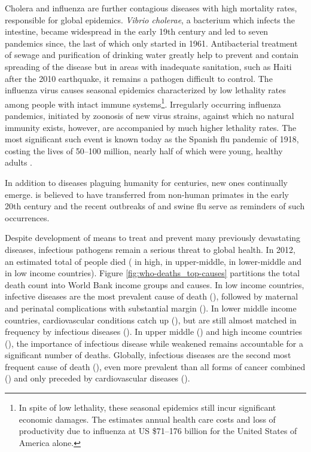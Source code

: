 Cholera and influenza are further contagious diseases with high mortality rates, responsible for global epidemics. \textit{Vibrio cholerae}, a bacterium which infects the intestine, became widespread in the early 19th century and led to seven pandemics since, the last of which only started in 1961. Antibacterial treatment of sewage and purification of drinking water greatly help to prevent and contain spreading of the disease but in areas with inadequate sanitation, such as Haiti after the 2010 earthquake, it remains a pathogen difficult to control. The influenza virus causes seasonal epidemics characterized by low lethality rates among people with intact immune systems\footnote{In spite of low lethality, these seasonal epidemics still incur significant economic damages. The \citet{WHO2003} estimates annual health care costs and loss of productivity due to influenza at US \$71--176 billion for the United States of America alone.}. Irregularly occurring influenza pandemics, initiated by zoonosis of new virus strains, against which no natural immunity exists, however, are accompanied by much higher lethality rates. The most significant such event is known today as the Spanish flu pandemic of 1918, costing the lives of 50--100 million, nearly half of which were young, healthy adults \citep{Taubenberger2006}.

In addition to diseases plaguing humanity for centuries, new ones continually emerge.  is believed to have transferred from non-human primates in the early 20th century and the recent outbreaks of  and swine flu serve as reminders of such occurrences.




Despite development of means to treat and prevent many previously devastating diseases, infectious pathogens remain a serious threat to global health. In 2012, an estimated total of \knitrTotalDeathsTwelve{} people died (\knitrPercentageDeathsTwelveHigh{} in high, \knitrPercentageDeathsTwelveUmid{} in upper-middle, \knitrPercentageDeathsTwelveLmid{} in lower-middle and \knitrPercentageDeathsTwelveLow{} in low income countries). Figure \ref{fig:who-deaths_top-causes} partitions the total death count into World Bank income groups and causes. In low income countries, infective diseases are the most prevalent cause of death (\knitrPercentDeathsTwelveLowInfect{}), followed by maternal and perinatal complications with substantial margin (\knitrPercentDeathsTwelveLowPerinat{}). In lower middle income countries, cardiovascular conditions catch up (\knitrPercentDeathsTwelveLmidCardio{}), but are still almost matched in frequency by infectious diseases (\knitrPercentDeathsTwelveLmidInfect{}). In upper middle (\knitrPercentDeathsTwelveUmidInfect{}) and high income countries (\knitrPercentDeathsTwelveHighInfect{}), the importance of infectious disease while weakened remains accountable for a significant number of deaths. Globally, infectious diseases are the second most frequent cause of death (\knitrPercentDeathsTwelveWorldInfect{}), even more prevalent than all forms of cancer combined (\knitrPercentDeathsTwelveWorldCancer{}) and only preceded by cardiovascular diseases (\knitrPercentDeathsTwelveWorldCardio{}).

